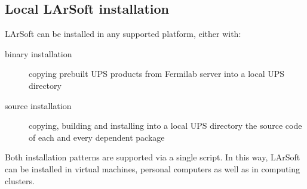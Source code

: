 \subsection{Local LArSoft installation}
\label{ssec:Repositories:LocalInstallation}

LArSoft can be installed in any supported platform, either with:
\begin{description}
   \item[binary installation] copying prebuilt UPS products from Fermilab server
      into a local UPS directory
   \item[source installation] copying, building and installing into a local UPS directory
      the source code of each and every dependent package
\end{description}
Both installation patterns are supported via a single script.
In this way, LArSoft can be installed in virtual machines, personal computers
as well as in computing clusters.
